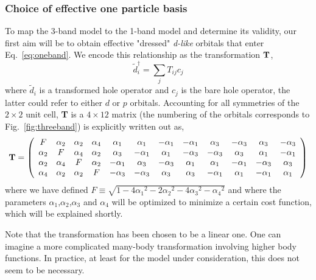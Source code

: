 \documentclass[prl,12pt,onecolumn,nofootinbib,notitlepage,english,superscriptaddress]{revtex4-1}
\begin{document}
\subsubsection{Choice of effective one particle basis}
To map the 3-band model to the 1-band model and determine its validity, 
our first aim will be to obtain effective "dressed" \emph{d-like} 
orbitals that enter Eq.~\ref{eq:oneband}. We encode this relationship as 
the transformation ${\bf T}$, 
\begin{equation}
	\tilde{d}_i^{\dagger} = \sum_{j} T_{ij} c_j
\end{equation}
where $\tilde{d}_i$ is a transformed hole operator and $c_j$ is the bare hole
operator, the latter could refer to either $d$ or $p$ orbitals. Accounting for all symmetries of 
the $2\times2$ unit cell, {\bf T} is a $4 \times 12 $ matrix (the numbering of the orbitals 
corresponds to Fig.~\ref{fig:threeband}) is explicitly written out as, 
\begin{eqnarray}
{\bf T} = 
\left(
\begin{array}{cccccccccccc}
F        & \alpha_2 &        \alpha_2 &  \alpha_4 & \alpha_1 & \alpha_1 & -\alpha_1 & -\alpha_1 & \alpha_3 & -\alpha_3 & \alpha_3 & -\alpha_3 \\
\alpha_2 &  F       &        \alpha_4 &  \alpha_2 & \alpha_3 & -\alpha_1 & \alpha_1 & -\alpha_3 & -\alpha_3 & \alpha_3 & \alpha_1 & -\alpha_1 \\
\alpha_2 & \alpha_4 & F               &  \alpha_2 & -\alpha_1 & \alpha_3 & -\alpha_3 & \alpha_1 & \alpha_1 & -\alpha_1 & -\alpha_3 & \alpha_3 \\
\alpha_4 & \alpha_2 & \alpha_2        &   F       & -\alpha_3 & -\alpha_3 & \alpha_3 & \alpha_3 & -\alpha_1 & \alpha_1 & -\alpha_1 & \alpha_1 \\
\end{array}
\right)
\end{eqnarray}
where we have defined $F \equiv \sqrt{1-4{\alpha_1}^2 - 2{\alpha_2}^2 - 4 {\alpha_3}^2 -{\alpha_4}^2}$ and 
where the parameters $\alpha_1$,$\alpha_2$,$\alpha_3$ and $\alpha_4$ will be 
optimized to minimize a certain cost function, which will be explained shortly. 

Note that the transformation has been chosen to be a linear one. One can imagine a more complicated 
many-body transformation involving higher body functions. In practice, at least for the model under 
consideration, this does not seem to be necessary. 
\end{document}
